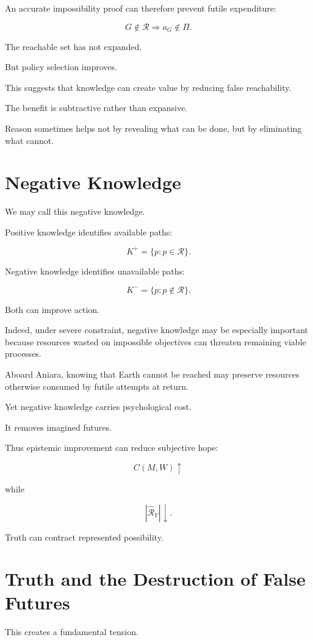 \documentclass[11pt,oneside]{book}
\theoremstyle{definition}
\theoremstyle{remark}
\newcommand{\R}{\mathcal{R}}
\begin{document}
An accurate impossibility proof can therefore prevent futile expenditure:

\[
G\notin\R
\Rightarrow
a_G\notin\Pi.
\]

The reachable set has not expanded.

But policy selection improves.

This suggests that knowledge can create value by reducing false reachability.

The benefit is subtractive rather than expansive.

Reason sometimes helps not by revealing what can be done, but by eliminating what cannot.

\section{Negative Knowledge}

We may call this negative knowledge.

Positive knowledge identifies available paths:

\[
K^+
=
\{p:p\in\R\}.
\]

Negative knowledge identifies unavailable paths:

\[
K^-
=
\{p:p\notin\R\}.
\]

Both can improve action.

Indeed, under severe constraint, negative knowledge may be especially important because resources wasted on impossible objectives can threaten remaining viable processes.

Aboard Aniara, knowing that Earth cannot be reached may preserve resources otherwise consumed by futile attempts at return.

Yet negative knowledge carries psychological cost.

It removes imagined futures.

Thus epistemic improvement can reduce subjective hope:

\[
C(M,W)\uparrow
\]

while

\[
|\widehat{\R}_V|\downarrow.
\]

Truth can contract represented possibility.

\section{Truth and the Destruction of False Futures}

This creates a fundamental tension.
\end{document}
